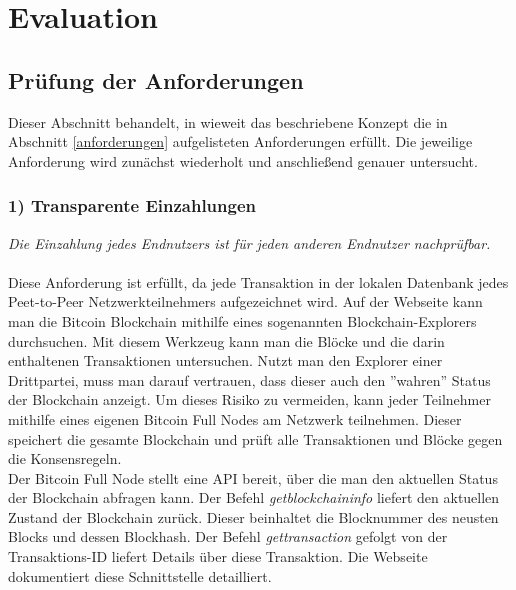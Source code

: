 \section{Evaluation}
\subsection{Prüfung der Anforderungen}\label{btc_evaluation}%

Dieser Abschnitt behandelt, in wieweit das beschriebene Konzept die in Abschnitt \ref{anforderungen} aufgelisteten Anforderungen erfüllt. Die jeweilige Anforderung wird zunächst wiederholt und anschließend genauer untersucht.

\subsubsection{1) Transparente Einzahlungen}
\textit{Die Einzahlung jedes Endnutzers ist für jeden anderen Endnutzer nachprüfbar.}\\\\
Diese Anforderung ist erfüllt, da jede Transaktion in der lokalen Datenbank jedes Peet-to-Peer Netzwerkteilnehmers aufgezeichnet wird. 
Auf der Webseite \cite{blockchain_info} kann man die Bitcoin Blockchain mithilfe eines sogenannten Blockchain-Explorers durchsuchen. Mit diesem Werkzeug kann man die Blöcke und die darin enthaltenen Transaktionen untersuchen. Nutzt man den Explorer einer Drittpartei, muss man darauf vertrauen, dass dieser auch den ''wahren'' Status der Blockchain anzeigt. Um dieses Risiko zu vermeiden, kann jeder Teilnehmer mithilfe eines eigenen Bitcoin Full Nodes am Netzwerk teilnehmen. Dieser speichert die gesamte Blockchain und prüft alle Transaktionen und Blöcke gegen die Konsensregeln.\\
Der Bitcoin Full Node stellt eine API bereit, über die man den aktuellen Status der Blockchain abfragen kann. Der Befehl \textit{getblockchaininfo} liefert den aktuellen Zustand der Blockchain zurück. Dieser beinhaltet die Blocknummer des neusten Blocks und dessen Blockhash. Der Befehl \textit{gettransaction} gefolgt von der Transaktions-ID liefert Details über diese Transaktion. Die Webseite \cite{btc_api} dokumentiert diese Schnittstelle detailliert. 

